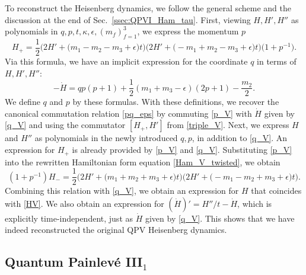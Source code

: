 \documentclass[12pt,a4paper]{article}
\numberwithin{equation}{section}
\begin{document}
To reconstruct the Heisenberg dynamics, we follow the general scheme and the discussion at the end of Sec.~\ref{ssec:QPVI_Ham_tau}.
First, viewing  $H,H',H''$ as polynomials in $q,p,t,\kappa,\epsilon,(m_f)_{f=1}^3$, we express the momentum $p$
\begin{equation}\label{p_V}
H_+=\frac12\Big(2H'+\big(m_1{-}m_2{-}m_3+\epsilon\big)t\Big) \Big(2H'+\big({-}m_1{+}m_2{-}m_3+\epsilon\big)t\Big)\big(1+p^{-1}).
\end{equation}
Via this formula, we have an implicit expression for the coordinate $q$ in terms of $H,H',H''$:
\begin{equation}\label{q_V}
-\dot{H}=qp(p+1)+\frac12(m_1{+}m_3{-}\epsilon)(2p+1)-\frac{m_2}2. 
\end{equation}
We define $q$ and $p$ by these formulas. With these definitions, we recover the canonical commutation relation \eqref{pq_eps} by commuting \eqref{p_V} with $\dot{H}$ given by \eqref{q_V} and using the commutator $[H_+,H']$ from \eqref{triple_V}.
Next, we express $H$ and $H''$ as polynomials in the newly introduced $q,p$, in addition to \eqref{q_V}.
An expression for $H_+$ is already provided by \eqref{p_V} and \eqref{q_V}.
Substituting \eqref{p_V} into the rewritten Hamiltonian form equation \eqref{Ham_V_twisted}, we obtain
\begin{equation}
(1+p^{-1})H_-=  \frac12\Big(2H'+\big(m_1{+}m_2{+}m_3+\epsilon\big)t\Big) \Big(2H'+\big({-}m_1{-}m_2{+}m_3+\epsilon\big)t\Big).
\end{equation}
Combining this relation with \eqref{q_V}, we obtain an expression for $H$ that coincides with \eqref{HV}. We also obtain an expression for $(\dot{H})'=H''/t-\dot{H}$, which is explicitly time-independent, just as $\dot{H}$ given by \eqref{q_V}. This shows that we have indeed reconstructed the original QPV Heisenberg dynamics.

\subsection{Quantum Painlev\'e III$_1$}
\label{ssec:QPIII1}
\end{document}
